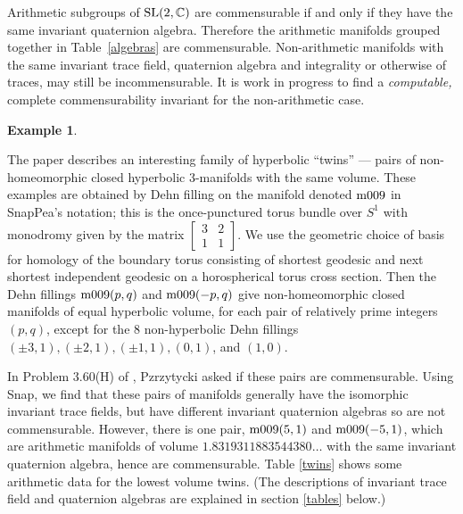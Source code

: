 \documentclass[a4paper]{amsart}
\def\C{{\mathbb C}}
\def\sl2c{\mbox{\rm SL}(2,\C)}
\theoremstyle{definition}
\newtheorem{example}[theorem]{Example}
\begin{document}
Arithmetic subgroups of $\sl2c$ are commensurable if and only if
they have the same invariant quaternion algebra. Therefore the
arithmetic manifolds grouped together in Table~\ref{algebras}
are commensurable. Non-arithmetic manifolds with the same invariant
trace field, quaternion algebra and integrality or otherwise of
traces, may still be incommensurable. It is work in progress to find
a {\em computable,} complete commensurability invariant for the
non-arithmetic case. 

\begin{example}\label{twinsex}

The paper \cite{BPZ} describes an interesting family of 
hyperbolic ``twins'' --- pairs of non-homeomorphic 
closed hyperbolic 3-manifolds with the same volume. 
These examples are obtained by Dehn filling on the
manifold denoted $\hbox{m009}$ in SnapPea's notation;
this is the once-punctured torus bundle over $S^1$
with monodromy given by the matrix
$
\left[ \begin{matrix}
3 & 2 \\                                     
1 & 1                     
\end{matrix}\right]
$.
We use the geometric choice of
basis for homology of the boundary torus 
consisting of shortest geodesic and next shortest independent geodesic
on a horospherical torus cross section. 
Then the Dehn fillings $\hbox{m009}(p,q)$ and $\hbox{m009}(-p,q)$
give non-homeomorphic closed manifolds of equal hyperbolic volume,
for each pair of relatively prime integers $(p,q)$,
except for the 8 non-hyperbolic Dehn fillings $(\pm 3,1), (\pm 2,1),
(\pm 1,1), (0,1)$, and $(1,0)$.

In Problem 3.60(H) of \cite{kirby}, Pzrzytycki asked if
these pairs are commensurable. Using Snap, we find that
these pairs of manifolds generally have the isomorphic invariant trace fields,
but have different invariant quaternion algebras
so are not commensurable. However, there is one pair,
$\hbox{m009}(5,1)$ and $\hbox{m009}(-5,1)$, which are arithmetic manifolds
of volume $1.8319311883544380\ldots$
with the same invariant quaternion algebra, hence are commensurable.
Table \ref{twins} shows some arithmetic data
for the lowest volume twins. (The descriptions of invariant trace field
and quaternion algebras are explained in section \ref{tables} below.)
\end{example}
\end{document}
